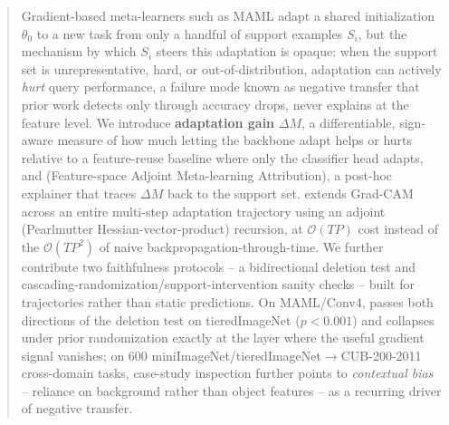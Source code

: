 \begin{abstract}
Gradient-based meta-learners such as MAML adapt a shared initialization $\theta_0$ to a new task from only a handful of support examples $S_i$, but the mechanism by which $S_i$ steers this adaptation is opaque: when the support set is unrepresentative, hard, or out-of-distribution, adaptation can actively \emph{hurt} query performance, a failure mode known as negative transfer that prior work detects only through accuracy drops, never explains at the feature level. We introduce \textbf{adaptation gain} $\Delta M$, a differentiable, sign-aware measure of how much letting the backbone adapt helps or hurts relative to a feature-reuse baseline where only the classifier head adapts, and \textbf{\fama} (Feature-space Adjoint Meta-learning Attribution), a post-hoc explainer that traces $\Delta M$ back to the support set. \fama extends Grad-CAM across an entire multi-step adaptation trajectory using an adjoint (Pearlmutter Hessian-vector-product) recursion, at $\mathcal{O}(TP)$ cost instead of the $\mathcal{O}(TP^2)$ of naive backpropagation-through-time. We further contribute two faithfulness protocols -- a bidirectional deletion test and cascading-randomization/support-intervention sanity checks -- built for trajectories rather than static predictions. On MAML/Conv4, \fama passes both directions of the deletion test on tieredImageNet ($p<0.001$) and collapses under prior randomization exactly at the layer where the useful gradient signal vanishes; on 600 miniImageNet/tieredImageNet$\to$CUB-200-2011 cross-domain tasks, case-study inspection further points to \emph{contextual bias} -- reliance on background rather than object features -- as a recurring driver of negative transfer.
\end{abstract}
